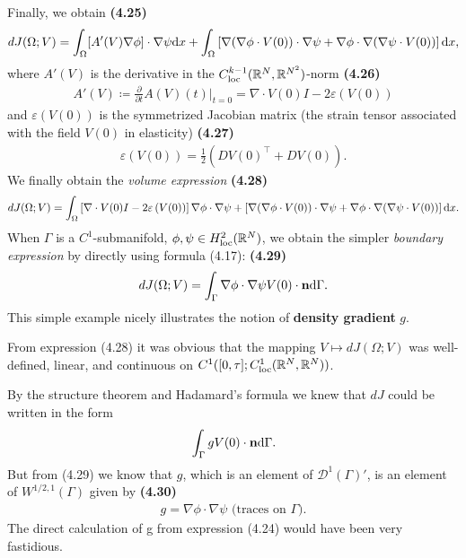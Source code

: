 \documentclass[oneside]{book}
\numberwithin{equation}{section}
\begin{document}
Finally, we obtain \textbf{(4.25)}
\begin{align*}
    dJ(\Omega;V) = \int_\Omega [A'(V)\nabla \phi]\cdot\nabla\psi{\rm d}x + \int_\Omega \left[\nabla(\nabla\phi\cdot V(0))\cdot\nabla\psi + \nabla\phi\cdot\nabla(\nabla\psi\cdot V(0))\right]{\rm d}x,
\end{align*}
where $A'(V)$ is the derivative in the $C_{\rm loc}^{k-1}(\mathbb{R}^N,\mathbb{R}^{N^2})$-norm \textbf{(4.26)}
\begin{align*}
    A'(V)\coloneqq\frac{\partial}{\partial t}A(V)(t)|_{t = 0} = \nabla\cdot V(0)I - 2\varepsilon\left(V(0)\right)
\end{align*}
and $\varepsilon(V(0))$ is the symmetrized Jacobian matrix (the strain tensor associated with the field $V(0)$ in elasticity) \textbf{(4.27)}
\begin{align*}
    \varepsilon\left(V(0)\right) = \frac{1}{2}\left(DV(0)^\top + DV(0)\right).
\end{align*}
We finally obtain the \textit{volume expression} \textbf{(4.28)}
\begin{align*}
    dJ(\Omega;V) = \int_\Omega \left[\nabla\cdot V(0)I - 2\varepsilon\left(V(0)\right)\right]\nabla\phi\cdot\nabla\psi + \left[\nabla(\nabla\phi\cdot V(0))\cdot\nabla\psi + \nabla\phi\cdot\nabla(\nabla\psi\cdot V(0))\right]{\rm d}x.
\end{align*}
When $\Gamma$ is a $C^1$-submanifold, $\phi,\psi\in H_{\rm loc}^2(\mathbb{R}^N)$, we obtain the simpler \textit{boundary expression} by directly using formula (4.17): \textbf{(4.29)}
\begin{align*}
    dJ(\Omega;V) = \int_\Gamma \nabla\phi\cdot\nabla\psi V(0)\cdot{\bf n}{\rm d}\Gamma.
\end{align*}
This simple example nicely illustrates the notion of \textbf{density gradient} $g$.

From expression (4.28) it was obvious that the mapping $V\mapsto dJ(\Omega;V)$ was well-defined, linear, and continuous on $C^1([0,\tau];C_{\rm loc}^1(\mathbb{R}^N,\mathbb{R}^N))$.

By the structure theorem and Hadamard's formula we knew that $dJ$ could be written in the form
\begin{align*}
    \int_\Gamma gV(0)\cdot{\bf n}{\rm d}\Gamma.
\end{align*}
But from (4.29) we know that $g$, which is an element of $\mathcal{D}^1(\Gamma)'$, is an element of $W^{1/2,1}(\Gamma)$ given by \textbf{(4.30)}
\begin{align*}
    g = \nabla\phi\cdot\nabla\psi \mbox{ (traces on }\Gamma).
\end{align*}
The direct calculation of g from expression (4.24) would have been very fastidious.
\end{document}
